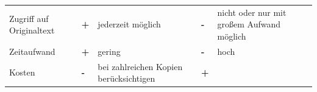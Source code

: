 \documentclass[]{book}
\theoremstyle{definition}
\theoremstyle{definition}
\theoremstyle{definition}
\theoremstyle{remark}
\begin{document}
\begin{longtable}[]{@{}lllll@{}}
\begin{minipage}[b]{0.28\columnwidth}
\end{minipage}\tabularnewline
\midrule
\endhead
\begin{minipage}[t]{0.28\columnwidth}\raggedright\strut
Zugriff auf Originaltext\strut
\end{minipage} & \begin{minipage}[t]{0.04\columnwidth}\raggedright\strut
\textbf{+}\strut
\end{minipage} & \begin{minipage}[t]{0.21\columnwidth}\raggedright\strut
jederzeit möglich\strut
\end{minipage} & \begin{minipage}[t]{0.04\columnwidth}\raggedright\strut
\textbf{-}\strut
\end{minipage} & \begin{minipage}[t]{0.28\columnwidth}\raggedright\strut
nicht oder nur mit großem Aufwand möglich \vspace{5mm}\strut
\end{minipage}\tabularnewline
\begin{minipage}[t]{0.28\columnwidth}\raggedright\strut
Zeitaufwand\strut
\end{minipage} & \begin{minipage}[t]{0.04\columnwidth}\raggedright\strut
\textbf{+}\strut
\end{minipage} & \begin{minipage}[t]{0.21\columnwidth}\raggedright\strut
gering\strut
\end{minipage} & \begin{minipage}[t]{0.04\columnwidth}\raggedright\strut
\textbf{-}\strut
\end{minipage} & \begin{minipage}[t]{0.28\columnwidth}\raggedright\strut
hoch \vspace{5mm}\strut
\end{minipage}\tabularnewline
\begin{minipage}[t]{0.28\columnwidth}\raggedright\strut
Kosten\strut
\end{minipage} & \begin{minipage}[t]{0.04\columnwidth}\raggedright\strut
\textbf{-}\strut
\end{minipage} & \begin{minipage}[t]{0.21\columnwidth}\raggedright\strut
bei zahlreichen Kopien berücksichtigen\strut
\end{minipage} & \begin{minipage}[t]{0.04\columnwidth}\raggedright\strut
\textbf{+}\strut

\end{minipage}
\end{longtable}
\end{document}
